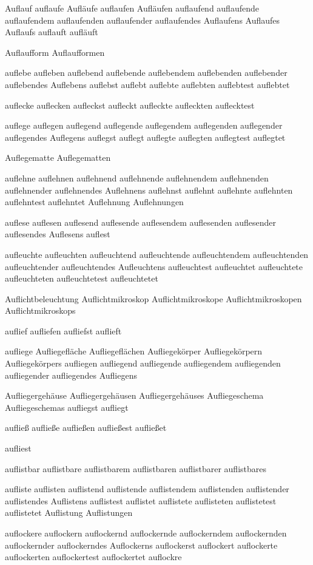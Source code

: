 Auflauf
auflaufe
Aufläufe
auflaufen
Aufläufen
auflaufend
auflaufende
auflaufendem
auflaufenden
auflaufender
auflaufendes
Auflaufens
Auflaufes
Auflaufs
auflauft
aufläuft

Auflaufform
Auflaufformen

auflebe
aufleben
auflebend
auflebende
auflebendem
auflebenden
auflebender
auflebendes
Auflebens
auflebst
auflebt
auflebte
auflebten
auflebtest
auflebtet

auflecke
auflecken
aufleckst
aufleckt
aufleckte
aufleckten
auflecktest

auflege
auflegen
auflegend
auflegende
auflegendem
auflegenden
auflegender
auflegendes
Auflegens
auflegst
auflegt
auflegte
auflegten
auflegtest
auflegtet

Auflegematte
Auflegematten

auflehne
auflehnen
auflehnend
auflehnende
auflehnendem
auflehnenden
auflehnender
auflehnendes
Auflehnens
auflehnst
auflehnt
auflehnte
auflehnten
auflehntest
auflehntet
Auflehnung
Auflehnungen

auflese
auflesen
auflesend
auflesende
auflesendem
auflesenden
auflesender
auflesendes
Auflesens
auflest

aufleuchte
aufleuchten
aufleuchtend
aufleuchtende
aufleuchtendem
aufleuchtenden
aufleuchtender
aufleuchtendes
Aufleuchtens
aufleuchtest
aufleuchtet
aufleuchtete
aufleuchteten
aufleuchtetest
aufleuchtetet

Auflichtbeleuchtung
Auflichtmikroskop
Auflichtmikroskope
Auflichtmikroskopen
Auflichtmikroskops

auflief
aufliefen
aufliefst
auflieft

aufliege
Aufliegefläche
Aufliegeflächen
Aufliegekörper
Aufliegekörpern
Aufliegekörpers
aufliegen
aufliegend
aufliegende
aufliegendem
aufliegenden
aufliegender
aufliegendes
Aufliegens

Aufliegergehäuse
Aufliegergehäusen
Aufliegergehäuses
Aufliegeschema
Aufliegeschemas
aufliegst
aufliegt

aufließ
aufließe
aufließen
aufließest
aufließet

aufliest

auflistbar
auflistbare
auflistbarem
auflistbaren
auflistbarer
auflistbares

aufliste
auflisten
auflistend
auflistende
auflistendem
auflistenden
auflistender
auflistendes
Auflistens
auflistest
auflistet
auflistete
auflisteten
auflistetest
auflistetet
Auflistung
Auflistungen

auflockere
auflockern
auflockernd
auflockernde
auflockerndem
auflockernden
auflockernder
auflockerndes
Auflockerns
auflockerst
auflockert
auflockerte
auflockerten
auflockertest
auflockertet
auflockre


